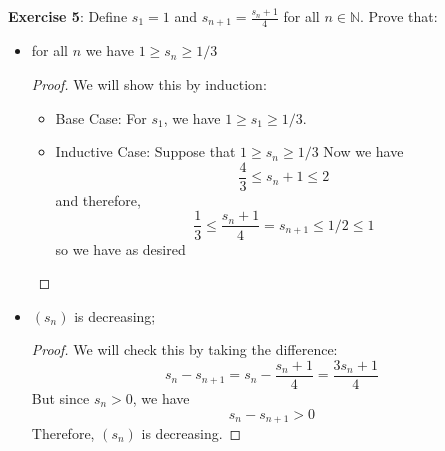 \documentclass{article}
\begin{document}
\textbf{Exercise 5}: Define $s_{1} = 1$ and $s_{n + 1} = \frac{s_{n} + 1}{4}$ for all $n \in \mathbb{N}$. Prove that:
    \begin{itemize}
        \item for all $n$ we have $1 \geq s_{n} \geq 1/3$
            \begin{proof}
                We will show this by induction:
                    \begin{itemize}
                        \item Base Case: For $s_{1}$, we have $1 \geq s_{1} \geq 1/3$.

                        \item Inductive Case: Suppose that $1 \geq s_{n} \geq 1/3$ Now we have 
                            \begin{equation*}
                                \dfrac{4}{3} \leq s_{n} + 1 \leq 2
                            \end{equation*}
                        and therefore, 
                            \begin{equation*}
                                \dfrac{1}{3} \leq \dfrac{s_{n} + 1}{4} = s_{n + 1} \leq 1/2 \leq 1
                            \end{equation*}
                        so we have as desired
                    \end{itemize}
            \end{proof}

        \item $(s_{n})$ is decreasing;
            \begin{proof}
                We will check this by taking the difference:
                    \begin{equation*}
                        s_{n} - s_{n + 1} = s_{n} - \dfrac{s_{n} + 1}{4} = \dfrac{3s_{n} + 1}{4}
                    \end{equation*}
                But since $s_{n} > 0$, we have
                    \begin{equation*}
                        s_{n} - s_{n + 1} > 0
                    \end{equation*}
                Therefore, $(s_{n})$ is decreasing.
            \end{proof}


\end{itemize}
\end{document}
